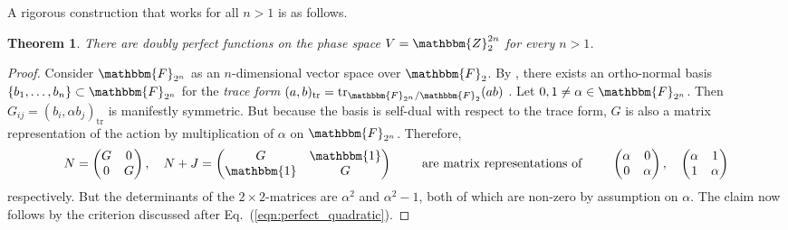 \documentclass[aps,nofootinbib,floatfix,a4paper]{revtex4}
\newtheorem{theorem}{Theorem}
\newcommand{\1}{\mbox{$\mathbf{1}$}}
\def\ZZ{\mathbbm{Z}}
\def\FF{\mathbbm{F}}
\def\Id{\mathbbm{1}}
\DeclareMathOperator{\tr}{tr}
\begin{document}
A rigorous construction that works for all $n>1$ is as follows.

\begin{theorem}\label{thm:even_doubly_perfect}
	There are doubly perfect functions on the phase space $V=\ZZ_2^{2n}$ for every $n>1$.
\end{theorem}

\begin{proof}
	Consider $\FF_{2^n}$ as an $n$-dimensional vector space over $\FF_2$.
	By \cite[Theorem~4]{seroussi1980factorization},
	there exists an ortho-normal basis 
	$\{b_1, \dots, b_n\}\subset \FF_{2^n}$ 
	for the \emph{trace form}
	$(a, b)_{\tr} = \tr_{\FF_{2^n}/\FF_2}(ab)$ .
	Let $0,1\neq \alpha\in\FF_{2^n}$. %
	Then $G_{ij}=(b_i, \alpha b_j)_{\tr}$ is manifestly symmetric.
	But because the basis is self-dual with respect to the trace form, $G$ is also a matrix representation of the action by multiplication of $\alpha$ on $\FF_{2^n}$.
	Therefore, 
	\begin{align*}
		N = 
		\begin{pmatrix}
			G & 0 \\
			0 & G
		\end{pmatrix},
		\quad
		N+J=
		\begin{pmatrix}
			G & \Id \\
			\Id & G
		\end{pmatrix}
		\qquad
		\text{ are matrix representations of }
		\qquad
		\begin{pmatrix}
			\alpha & 0 \\
			0 & \alpha
		\end{pmatrix},
		\quad
		\begin{pmatrix}
			\alpha & 1 \\
			1 & \alpha
		\end{pmatrix}
	\end{align*}
	respectively.
	But the determinants of the $2\times 2$-matrices are $\alpha^2$ and $\alpha^2-1$, both of which are non-zero by assumption on $\alpha$.
	The claim now follows by the criterion discussed after Eq.~(\ref{eqn:perfect_quadratic}).
\end{proof}
\end{document}
